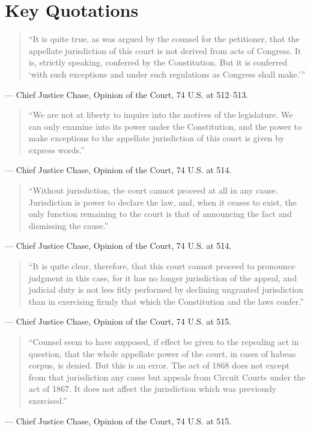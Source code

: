 \documentclass[12pt]{article}
\begin{document}
\section{Key Quotations}
\begin{quote}
``It is quite true, as was argued by the counsel for the petitioner, that the appellate jurisdiction of this court is not derived from acts of Congress. It is, strictly speaking, conferred by the Constitution. But it is conferred `with such exceptions and under such regulations as Congress shall make.'''
\end{quote}
\noindent --- Chief Justice Chase, Opinion of the Court, 74 U.S. at 512--513.

\begin{quote}
``We are not at liberty to inquire into the motives of the legislature. We can only examine into its power under the Constitution, and the power to make exceptions to the appellate jurisdiction of this court is given by express words.''
\end{quote}
\noindent --- Chief Justice Chase, Opinion of the Court, 74 U.S. at 514.

\begin{quote}
``Without jurisdiction, the court cannot proceed at all in any cause. Jurisdiction is power to declare the law, and, when it ceases to exist, the only function remaining to the court is that of announcing the fact and dismissing the cause.''
\end{quote}
\noindent --- Chief Justice Chase, Opinion of the Court, 74 U.S. at 514.

\begin{quote}
``It is quite clear, therefore, that this court cannot proceed to pronounce judgment in this case, for it has no longer jurisdiction of the appeal, and judicial duty is not less fitly performed by declining ungranted jurisdiction than in exercising firmly that which the Constitution and the laws confer.''
\end{quote}
\noindent --- Chief Justice Chase, Opinion of the Court, 74 U.S. at 515.

\begin{quote}
``Counsel seem to have supposed, if effect be given to the repealing act in question, that the whole appellate power of the court, in cases of habeas corpus, is denied. But this is an error. The act of 1868 does not except from that jurisdiction any cases but appeals from Circuit Courts under the act of 1867. It does not affect the jurisdiction which was previously exercised.''
\end{quote}
\noindent --- Chief Justice Chase, Opinion of the Court, 74 U.S. at 515.
\end{document}
